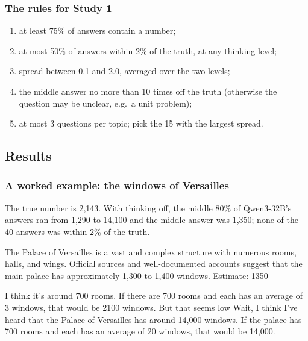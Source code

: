 \documentclass[11pt,a4paper]{article}
\begin{document}
\subsubsection{The rules for Study 1}
\begin{enumerate}[leftmargin=*]
  \item at least 75\% of answers contain a number;
  \item at most 50\% of answers within 2\% of the truth, at any thinking level;
  \item spread between 0.1 and 2.0, averaged over the two levels;
  \item the middle answer no more than 10 times off the truth (otherwise the question may be unclear, e.g.\ a unit problem);
  \item at most 3 questions per topic; pick the 15 with the largest spread.
\end{enumerate}

\subsection{Results}

\subsubsection{A worked example: the windows of Versailles}
The true number is 2,143. With thinking off, the middle 80\% of Qwen3-32B's answers ran from 1,290 to 14,100 and the middle answer was 1,350; none of the 40 answers was within 2\% of the truth.

\begin{transcript}
The Palace of Versailles is a vast and complex structure with numerous rooms, halls, and wings. \cut{} Official sources and well-documented accounts suggest that the main palace has approximately 1,300 to 1,400 windows. Estimate: 1350
\end{transcript}

\begin{transcript}
\cut{} I think it's around 700 rooms. \cut{} If there are 700 rooms and each has an average of 3 windows, that would be 2100 windows. But that seems low \cut{} Wait, I think I've heard that the Palace of Versailles has around 14,000 windows. \cut{} If the palace has 700 rooms and each has an average of 20 windows, that would be 14,000.
\end{transcript}
\end{document}
